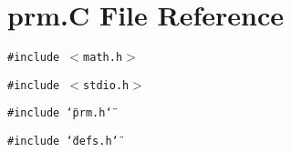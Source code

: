 \section{prm.C File Reference}
\label{prm_8C}
{\tt \#include $<$math.h$>$}\par
{\tt \#include $<$stdio.h$>$}\par
{\tt \#include \char`\"{}prm.h\char`\"{}}\par
{\tt \#include \char`\"{}defs.h\char`\"{}}\par
